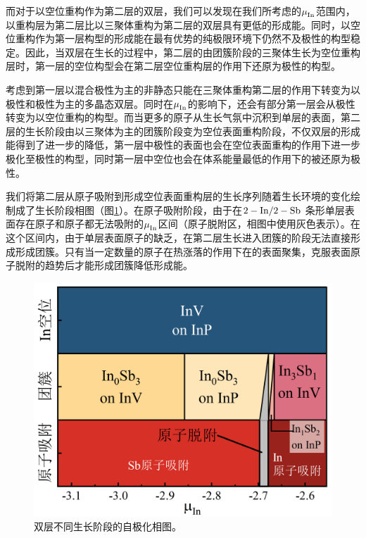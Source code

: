 而对于以空位重构作为第二层的双层，我们可以发现在我们所考虑的$\it \mu_{\rm In}^{\rm } \it$范围内，以重构层为第二层比以三聚体重构为第二层的双层具有更低的形成能。同时，以空位重构作为第一层构型的形成能在最有优势的纯极限环境下仍然不及极性的构型稳定。因此，当双层在生长的过程中，第二层的由团簇阶段的三聚体生长为空位重构层时，第一层的空位构型会在第二层空位重构层的作用下还原为极性的构型。

考虑到第一层以混合极性为主的非静态只能在三聚体重构第二层的作用下转变为以极性和极性为主的多晶态双层。同时在$\it \mu_{\rm In}^{\rm } \it$的影响下，还会有部分第一层会从极性转变为以空位重构的构型。而当更多的原子从生长气氛中沉积到单层的表面，第二层的生长阶段由以三聚体为主的团簇阶段变为空位表面重构阶段，不仅双层的形成能得到了进一步的降低，第一层中极性的表面也会在空位表面重构的作用下进一步极化至极性的构型，同时第一层中空位也会在体系能量最低的作用下的被还原为极性。


我们将第二层从原子吸附到形成空位表面重构层的生长序列随着生长环境的变化绘制成了生长阶段相图（图\ref{fig:IS_DFT_stagePhase}）。在原子吸附阶段，由于在$\rm 2-In/2-Sb$ 条形单层表面存在原子和原子都无法吸附的$\it \mu_{\rm In}^{\rm } \it$区间（原子脱附区，相图中使用灰色表示）。在这个区间内，由于单层表面原子的缺乏，在第二层生长进入团簇的阶段无法直接形成形成团簇。只有当一定数量的原子在热涨落的作用下在的表面聚集，克服表面原子脱附的趋势后才能形成团簇降低形成能。

\begin{figure}[!htb]
    \includegraphics{pic/IS_DFT_stagePhase.png}
    \caption{双层不同生长阶段的自极化相图。}
    \label{fig:IS_DFT_stagePhase}
\end{figure}

